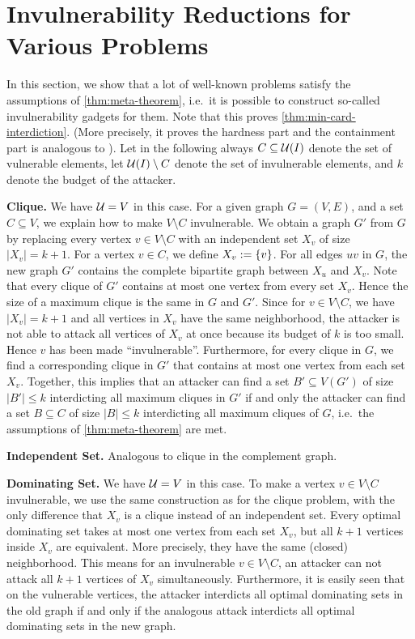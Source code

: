 \section{Invulnerability Reductions for Various Problems}
\label{sec:invulnerability-gadgets}
In this section, we show that a lot of well-known problems satisfy the assumptions of \cref{thm:meta-theorem}, i.e.\ it is possible to construct so-called invulnerability gadgets for them.
Note that this proves \cref{thm:min-card-interdiction}.
(More precisely, it proves the hardness part and the containment part is analogous to \cite{gruene2024completeness}).
Let in the following always $C \subseteq \mathcal{U}(I)$ denote the set of vulnerable elements, let $\mathcal{U}(I) \setminus C$ denote the set of invulnerable elements, and $k$ denote the budget of the attacker.

\textbf{Clique.}
We have $\mathcal{U} = V$ in this case.
For a given graph $G = (V,E)$, and a set $C \subseteq V$, we explain how to make $V \setminus C$ invulnerable.
We obtain a graph $G'$ from $G$ by replacing every vertex $v \in V \setminus C$ with an independent set $X_v$ of size $|X_v| = k+1$. 
For a vertex $v \in C$, we define $X_v := \{ v \}$.
For all edges $uv$ in $G$, the new graph $G'$ contains the complete bipartite graph between $X_u$ and $X_v$.
Note that every clique of $G'$ contains at most one vertex from every set $X_v$. Hence the size of a maximum clique is the same in $G$ and $G'$. 
Since for $v \in V \setminus C$, we have $|X_v| = k+1$ and all vertices in $X_v$ have the same neighborhood, the attacker is not able to attack all vertices of $X_v$ at once because its budget of $k$ is too small.
Hence $v$ has been made \enquote{invulnerable}.
Furthermore, for every clique in $G$, we find a corresponding clique in $G'$ that contains at most one vertex from each set $X_v$. 
Together, this implies that an attacker can find a set $B' \subseteq V(G')$ of size $|B'| \leq k$ interdicting all maximum cliques in $G'$ if and only the attacker can find a set $B \subseteq C$ of size $|B| \leq k$ interdicting all maximum cliques of $G$, i.e.\ the assumptions of \cref{thm:meta-theorem} are met.

\textbf{Independent Set.} Analogous to clique in the complement graph.

\textbf{Dominating Set.} We have $\mathcal{U} = V$ in this case. 
To make a vertex $v \in V \setminus C$ invulnerable, we use the same construction as for the clique problem, with the only difference that $X_v$ is a clique instead of an independent set. 
Every optimal dominating set takes at most one vertex from each set $X_v$, but all $k+1$ vertices inside $X_v$ are equivalent. More precisely, they have the same (closed) neighborhood. 
This means for an invulnerable $v \in V \setminus C$, an attacker can not attack all $k+1$ vertices of $X_v$ simultaneously. 
Furthermore, it is easily seen that on the vulnerable vertices, the attacker interdicts all optimal dominating sets in the old graph if and only if the analogous attack interdicts all optimal dominating sets in the new graph.

